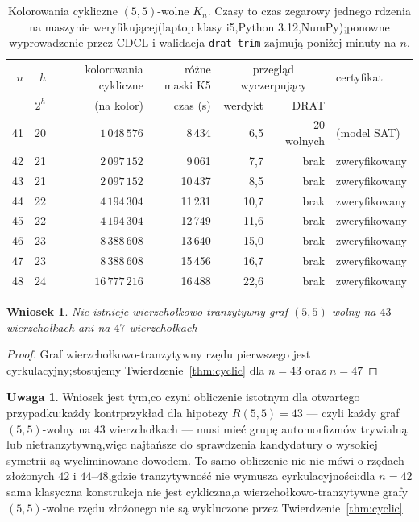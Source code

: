 \documentclass[11pt]{article}
\newtheorem{corollary}[theorem]{Wniosek}
\theoremstyle{definition}
\newtheorem{remark}[theorem]{Uwaga}
\theoremstyle{plain}
\newcommand{\K}{\ensuremath{K}}
\newcommand{\R}[2]{\ensuremath{R(#1,#2)}}
\begin{document}
\begin{table}[ht]\centering\small
\begin{tabular}{rrrrrrl}
\toprule
$n$ & $h$ & kolorowania cykliczne & różne maski K5 & \multicolumn{2}{c}{przegląd wyczerpujący} & certyfikat \\
 & $2^h$ & (na kolor)& czas (s)& werdykt & DRAT \\
\midrule
41 & 20 & $1\,048\,576$ & 8\,434 & 6,5 & 20 wolnych & (model SAT) \\
42 & 21 & $2\,097\,152$ & 9\,061 & 7,7 & brak & zweryfikowany \\
43 & 21 & $2\,097\,152$ & 10\,437 & 8,5 & brak & zweryfikowany \\
44 & 22 & $4\,194\,304$ & 11\,231 & 10,7 & brak & zweryfikowany \\
45 & 22 & $4\,194\,304$ & 12\,749 & 11,6 & brak & zweryfikowany \\
46 & 23 & $8\,388\,608$ & 13\,640 & 15,0 & brak & zweryfikowany \\
47 & 23 & $8\,388\,608$ & 15\,456 & 16,7 & brak & zweryfikowany \\
48 & 24 & $16\,777\,216$ & 16\,488 & 22,6 & brak & zweryfikowany \\
\bottomrule
\end{tabular}
\caption{Kolorowania cykliczne $(5,5)$-wolne $\K_n$. Czasy to czas zegarowy jednego rdzenia na maszynie weryfikującej(laptop klasy i5,Python 3.12,NumPy);ponowne wyprowadzenie przez CDCL i walidacja \texttt{drat-trim} zajmują poniżej minuty na $n$.}
\label{tab:cyclic55}
\end{table}

\begin{corollary}\label{cor:vt5}
Nie istnieje wierzchołkowo-tranzytywny graf $(5,5)$-wolny na $43$ wierzchołkach ani na $47$ wierzchołkach\end{corollary}

\begin{proof}
Graf wierzchołkowo-tranzytywny rzędu pierwszego jest cyrkulacyjny;stosujemy Twierdzenie~\ref{thm:cyclic} dla $n = 43$ oraz $n = 47$\end{proof}

\begin{remark}
Wniosek jest tym,co czyni obliczenie istotnym dla otwartego przypadku:każdy kontrprzykład dla hipotezy $\R{5}{5} = 43$ --- czyli każdy graf $(5,5)$-wolny na $43$ wierzchołkach --- musi mieć grupę automorfizmów trywialną lub nietranzytywną,więc najtańsze do sprawdzenia kandydatury o wysokiej symetrii są wyeliminowane dowodem. To samo obliczenie nic nie mówi o rzędach złożonych $42$ i $44$--$48$,gdzie tranzytywność nie wymusza cyrkulacyjności:dla $n = 42$ sama klasyczna konstrukcja nie jest cykliczna,a wierzchołkowo-tranzytywne grafy $(5,5)$-wolne rzędu złożonego nie są wykluczone przez Twierdzenie~\ref{thm:cyclic}\end{remark}
\end{document}
